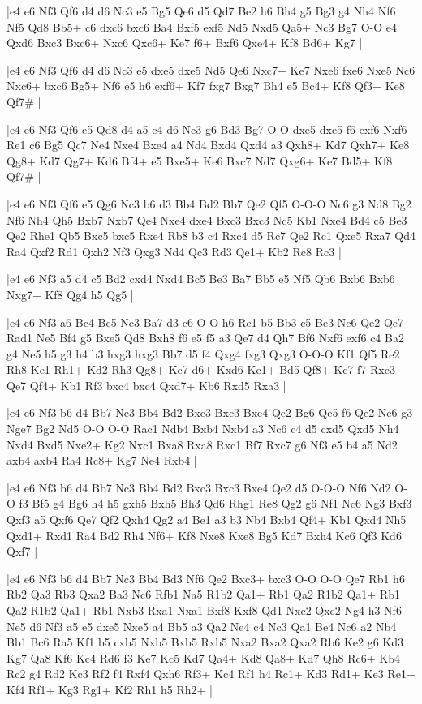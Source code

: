 \whitename{}
\blackname{}
\makegametitle
|e4 e6 Nf3 Qf6 d4 d6 Nc3 e5 Bg5 Qe6 d5 Qd7 Be2 h6 Bh4 g5 Bg3 g4 Nh4 Nf6 Nf5 Qd8 Bb5+ c6 dxc6 bxc6 Ba4 Bxf5 exf5 Nd5 Nxd5 Qa5+ Nc3 Bg7 O-O e4 Qxd6 Bxc3 Bxc6+ Nxc6 Qxc6+ Ke7 f6+ Bxf6 Qxe4+ Kf8 Bd6+ Kg7  |

\whitename{}
\blackname{}
\makegametitle
|e4 e6 Nf3 Qf6 d4 d6 Nc3 e5 dxe5 dxe5 Nd5 Qe6 Nxc7+ Ke7 Nxe6 fxe6 Nxe5 Nc6 Nxc6+ bxc6 Bg5+ Nf6 e5 h6 exf6+ Kf7 fxg7 Bxg7 Bh4 e5 Bc4+ Kf8 Qf3+ Ke8 Qf7\#  |

\whitename{}
\blackname{}
\makegametitle
|e4 e6 Nf3 Qf6 e5 Qd8 d4 a5 c4 d6 Nc3 g6 Bd3 Bg7 O-O dxe5 dxe5 f6 exf6 Nxf6 Re1 c6 Bg5 Qc7 Ne4 Nxe4 Bxe4 a4 Nd4 Bxd4 Qxd4 a3 Qxh8+ Kd7 Qxh7+ Ke8 Qg8+ Kd7 Qg7+ Kd6 Bf4+ e5 Bxe5+ Ke6 Bxc7 Nd7 Qxg6+ Ke7 Bd5+ Kf8 Qf7\#  |

\whitename{}
\blackname{}
\makegametitle
|e4 e6 Nf3 Qf6 e5 Qg6 Nc3 b6 d3 Bb4 Bd2 Bb7 Qe2 Qf5 O-O-O Nc6 g3 Nd8 Bg2 Nf6 Nh4 Qh5 Bxb7 Nxb7 Qe4 Nxe4 dxe4 Bxc3 Bxc3 Nc5 Kb1 Nxe4 Bd4 c5 Be3 Qe2 Rhe1 Qb5 Bxc5 bxc5 Rxe4 Rb8 b3 c4 Rxc4 d5 Rc7 Qe2 Rc1 Qxe5 Rxa7 Qd4 Ra4 Qxf2 Rd1 Qxh2 Nf3 Qxg3 Nd4 Qc3 Rd3 Qe1+ Kb2 Rc8 Rc3  |

\whitename{}
\blackname{}
\makegametitle
|e4 e6 Nf3 a5 d4 c5 Bd2 cxd4 Nxd4 Bc5 Be3 Ba7 Bb5 e5 Nf5 Qb6 Bxb6 Bxb6 Nxg7+ Kf8 Qg4 h5 Qg5  |

\whitename{}
\blackname{}
\makegametitle
|e4 e6 Nf3 a6 Bc4 Bc5 Nc3 Ba7 d3 c6 O-O h6 Re1 b5 Bb3 c5 Be3 Nc6 Qe2 Qc7 Rad1 Ne5 Bf4 g5 Bxe5 Qd8 Bxh8 f6 e5 f5 a3 Qe7 d4 Qh7 Bf6 Nxf6 exf6 c4 Ba2 g4 Ne5 h5 g3 h4 b3 hxg3 hxg3 Bb7 d5 f4 Qxg4 fxg3 Qxg3 O-O-O Kf1 Qf5 Re2 Rh8 Ke1 Rh1+ Kd2 Rh3 Qg8+ Kc7 d6+ Kxd6 Kc1+ Bd5 Qf8+ Kc7 f7 Rxc3 Qe7 Qf4+ Kb1 Rf3 bxc4 bxc4 Qxd7+ Kb6 Rxd5 Rxa3  |

\whitename{}
\blackname{}
\makegametitle
|e4 e6 Nf3 b6 d4 Bb7 Nc3 Bb4 Bd2 Bxc3 Bxc3 Bxe4 Qe2 Bg6 Qe5 f6 Qe2 Nc6 g3 Nge7 Bg2 Nd5 O-O O-O Rac1 Ndb4 Bxb4 Nxb4 a3 Nc6 c4 d5 cxd5 Qxd5 Nh4 Nxd4 Bxd5 Nxe2+ Kg2 Nxc1 Bxa8 Rxa8 Rxc1 Bf7 Rxc7 g6 Nf3 e5 b4 a5 Nd2 axb4 axb4 Ra4 Rc8+ Kg7 Ne4 Rxb4  |

\whitename{}
\blackname{}
\makegametitle
|e4 e6 Nf3 b6 d4 Bb7 Nc3 Bb4 Bd2 Bxc3 Bxc3 Bxe4 Qe2 d5 O-O-O Nf6 Nd2 O-O f3 Bf5 g4 Bg6 h4 h5 gxh5 Bxh5 Bh3 Qd6 Rhg1 Re8 Qg2 g6 Nf1 Nc6 Ng3 Bxf3 Qxf3 a5 Qxf6 Qe7 Qf2 Qxh4 Qg2 a4 Be1 a3 b3 Nb4 Bxb4 Qf4+ Kb1 Qxd4 Nh5 Qxd1+ Rxd1 Ra4 Bd2 Rh4 Nf6+ Kf8 Nxe8 Kxe8 Bg5 Kd7 Bxh4 Kc6 Qf3 Kd6 Qxf7  |

\whitename{}
\blackname{}
\makegametitle
|e4 e6 Nf3 b6 d4 Bb7 Nc3 Bb4 Bd3 Nf6 Qe2 Bxc3+ bxc3 O-O O-O Qe7 Rb1 h6 Rb2 Qa3 Rb3 Qxa2 Ba3 Nc6 Rfb1 Na5 R1b2 Qa1+ Rb1 Qa2 R1b2 Qa1+ Rb1 Qa2 R1b2 Qa1+ Rb1 Nxb3 Rxa1 Nxa1 Bxf8 Kxf8 Qd1 Nxc2 Qxc2 Ng4 h3 Nf6 Ne5 d6 Nf3 a5 e5 dxe5 Nxe5 a4 Bb5 a3 Qa2 Ne4 c4 Nc3 Qa1 Be4 Nc6 a2 Nb4 Bb1 Bc6 Ra5 Kf1 b5 cxb5 Nxb5 Bxb5 Rxb5 Nxa2 Bxa2 Qxa2 Rb6 Ke2 g6 Kd3 Kg7 Qa8 Kf6 Kc4 Rd6 f3 Ke7 Kc5 Kd7 Qa4+ Kd8 Qa8+ Kd7 Qh8 Rc6+ Kb4 Rc2 g4 Rd2 Kc3 Rf2 f4 Rxf4 Qxh6 Rf3+ Kc4 Rf1 h4 Rc1+ Kd3 Rd1+ Ke3 Re1+ Kf4 Rf1+ Kg3 Rg1+ Kf2 Rh1 h5 Rh2+  |


